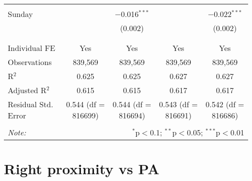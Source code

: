 \documentclass[
]{article}
\begin{document}
\begin{table}[!htbp]
{\begin{tabular}{@{\extracolsep{5pt}}lcccc}
  & & & & \\ 
 Sunday &  & $-$0.016$^{***}$ &  & $-$0.022$^{***}$ \\ 
  &  & (0.002) &  & (0.002) \\ 
  & & & & \\ 
\hline \\[-1.8ex] 
Individual FE & Yes & Yes & Yes & Yes \\ 
Observations & 839,569 & 839,569 & 839,569 & 839,569 \\ 
R$^{2}$ & 0.625 & 0.625 & 0.627 & 0.627 \\ 
Adjusted R$^{2}$ & 0.615 & 0.615 & 0.617 & 0.617 \\ 
Residual Std. Error & 0.544 (df = 816699) & 0.544 (df = 816694) & 0.543 (df = 816691) & 0.542 (df = 816686) \\ 
\hline 
\hline \\[-1.8ex] 
\textit{Note:}  & \multicolumn{4}{r}{$^{*}$p$<$0.1; $^{**}$p$<$0.05; $^{***}$p$<$0.01} \\ 
\end{tabular}
} 
\end{table} 
\newpage
\section{Right proximity vs PA}
\end{document}
